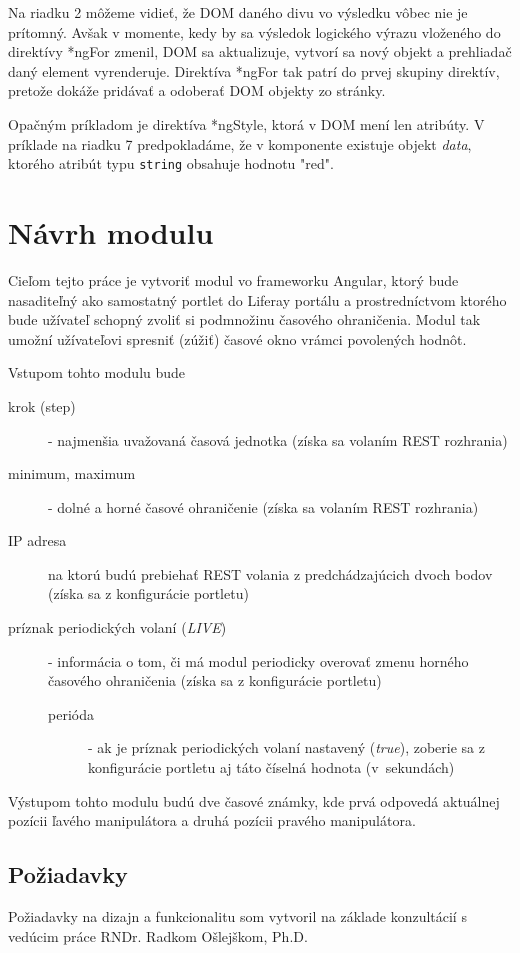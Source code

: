 \documentclass[
  digital, %
  twoside, %
  notable,   %
  nolof,   %
  nolot,   %
]{fithesis3}
\begin{document}
Na riadku 2 môžeme vidieť, že DOM daného divu vo výsledku vôbec nie je prítomný. Avšak v momente, kedy by sa výsledok logického výrazu vloženého do direktívy *ngFor zmenil, DOM sa aktualizuje, vytvorí sa nový objekt a prehliadač daný element vyrenderuje. Direktíva *ngFor tak patrí do prvej skupiny direktív, pretože dokáže pridávať a odoberať DOM objekty zo stránky.

Opačným príkladom je direktíva *ngStyle, ktorá v DOM mení len atribúty. V príklade na riadku 7 predpokladáme, že v komponente existuje objekt \textit{data}, ktorého atribút typu \texttt{string} obsahuje hodnotu "red".

\chapter{Návrh modulu}
Cieľom tejto práce je vytvoriť modul vo frameworku Angular, ktorý bude nasaditeľný ako samostatný portlet do Liferay portálu a prostredníctvom ktorého bude užívateľ schopný zvoliť si podmnožinu časového ohraničenia. Modul tak umožní užívateľovi spresniť (zúžiť) časové okno vrámci povolených hodnôt.

Vstupom tohto modulu bude
\begin{description}
\item[krok (step)] - najmenšia uvažovaná časová jednotka (získa sa volaním REST rozhrania)
\item[minimum, maximum] - dolné a horné časové ohraničenie (získa sa volaním REST rozhrania)
\item[IP adresa] na ktorú budú prebiehať REST volania z predchádzajúcich dvoch bodov (získa sa z konfigurácie portletu)
\item[príznak periodických volaní (\textit{LIVE})] - informácia o tom, či má modul periodicky overovať zmenu horného časového ohraničenia (získa sa z konfigurácie portletu)
\begin{description}
\item[perióda] - ak je príznak periodických volaní nastavený (\textit{true}), zoberie sa z konfigurácie portletu aj táto číselná hodnota (v~sekundách)
\end{description}
\end{description}
Výstupom tohto modulu budú dve časové známky, kde prvá odpovedá aktuálnej pozícii ľavého manipulátora a druhá pozícii pravého manipulátora.

\section{Požiadavky}
Požiadavky na dizajn a funkcionalitu som vytvoril na základe konzultácií s vedúcim práce RNDr. Radkom Ošlejškom, Ph.D.
\end{document}

